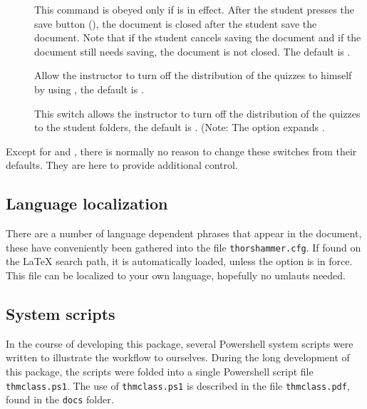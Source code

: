 \documentclass{article}
\let\uif\textsf
\begin{document}
\begin{description}
\item[] This command is obeyed only if
    \cmd{\stuAutoSaveOn} is in effect. After the student presses the save
    button (\cmd\stuSaveBtn), the document is closed after the student save
    the document. Note that if the student cancels saving the document and
    if the document still needs saving, the document is not closed. The
    default is \cmd\stuAutoCloseOn.

\item[] Allow the instructor to turn off the
    distribution of the quizzes to himself by using ,
    the default is .

\item[\cmd\distrToStudentsOff] This switch allows the instructor to turn off
    the distribution of the quizzes to the student folders, the default is
    . (Note: The  option expands
    .

\end{description}
Except for  and , there is normally no reason
to change these switches from their defaults. They are here to provide
additional control.

\subsection{Language localization}\label{s:lang}

There are a number of language dependent phrases that appear in the
document, these have conveniently been gathered into the file
\texttt{thorshammer.cfg}. If found on the {\LaTeX} search path, it is
automatically loaded, unless the  option is in force. This file
can be localized to your own language, hopefully no umlauts needed.


\subsection{System scripts}\label{s:sysscrpts}

In the course of developing this package, several
\uif{Powershell} system scripts were written to illustrate the
workflow to ourselves. During the long development of this
package, the scripts were folded into a single \uif{Powershell}
script file \texttt{thmclass.ps1}. The use of
\texttt{thmclass.ps1} is described in the file
\texttt{thmclass.pdf}, found in the \texttt{docs} folder.
\end{document}
